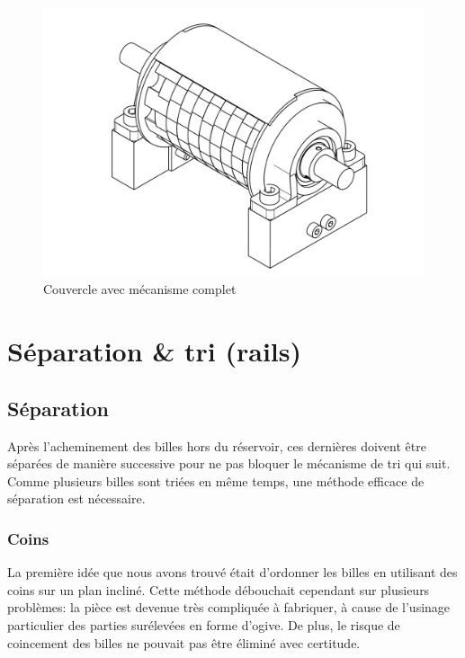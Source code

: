 \begin{figure}
    \centering
    \includegraphics[width=\textwidth]{Graphics/Roue/DRAWING_COUVERCLE_COMPLET.pdf}
    \caption{Couvercle avec mécanisme complet}
\end{figure}

\section{Séparation \& tri (rails)}

\subsection{Séparation}
Après l'acheminement des billes hors du réservoir, ces dernières doivent être séparées de manière successive pour ne pas bloquer le mécanisme de tri qui suit. Comme plusieurs billes sont triées en même temps, une méthode efficace de séparation est nécessaire. 

\subsubsection{Coins}
La première idée que nous avons trouvé était d'ordonner les billes en utilisant des coins sur un plan incliné. Cette méthode débouchait cependant sur plusieurs problèmes: la pièce est devenue très compliquée à fabriquer, à cause de l'usinage particulier des parties surélevées en forme d'ogive. De plus, le risque de coincement des billes ne pouvait pas être éliminé avec certitude.

